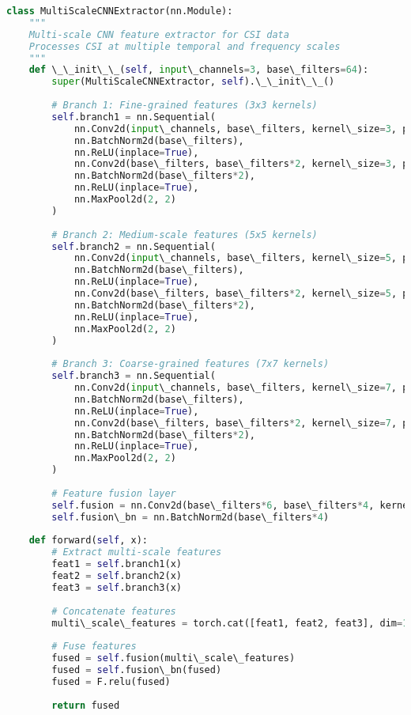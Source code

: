 \documentclass[journal]{IEEEtran}
\begin{document}
\begin{lstlisting}[language=Python, caption=Multi-Scale CNN Implementation]
class MultiScaleCNNExtractor(nn.Module):
    """
    Multi-scale CNN feature extractor for CSI data
    Processes CSI at multiple temporal and frequency scales
    """
    def \_\_init\_\_(self, input\_channels=3, base\_filters=64):
        super(MultiScaleCNNExtractor, self).\_\_init\_\_()
        
        # Branch 1: Fine-grained features (3x3 kernels)
        self.branch1 = nn.Sequential(
            nn.Conv2d(input\_channels, base\_filters, kernel\_size=3, padding=1),
            nn.BatchNorm2d(base\_filters),
            nn.ReLU(inplace=True),
            nn.Conv2d(base\_filters, base\_filters*2, kernel\_size=3, padding=1),
            nn.BatchNorm2d(base\_filters*2),
            nn.ReLU(inplace=True),
            nn.MaxPool2d(2, 2)
        )
        
        # Branch 2: Medium-scale features (5x5 kernels)
        self.branch2 = nn.Sequential(
            nn.Conv2d(input\_channels, base\_filters, kernel\_size=5, padding=2),
            nn.BatchNorm2d(base\_filters),
            nn.ReLU(inplace=True),
            nn.Conv2d(base\_filters, base\_filters*2, kernel\_size=5, padding=2),
            nn.BatchNorm2d(base\_filters*2),
            nn.ReLU(inplace=True),
            nn.MaxPool2d(2, 2)
        )
        
        # Branch 3: Coarse-grained features (7x7 kernels)
        self.branch3 = nn.Sequential(
            nn.Conv2d(input\_channels, base\_filters, kernel\_size=7, padding=3),
            nn.BatchNorm2d(base\_filters),
            nn.ReLU(inplace=True),
            nn.Conv2d(base\_filters, base\_filters*2, kernel\_size=7, padding=3),
            nn.BatchNorm2d(base\_filters*2),
            nn.ReLU(inplace=True),
            nn.MaxPool2d(2, 2)
        )
        
        # Feature fusion layer
        self.fusion = nn.Conv2d(base\_filters*6, base\_filters*4, kernel\_size=1)
        self.fusion\_bn = nn.BatchNorm2d(base\_filters*4)
        
    def forward(self, x):
        # Extract multi-scale features
        feat1 = self.branch1(x)
        feat2 = self.branch2(x)
        feat3 = self.branch3(x)
        
        # Concatenate features
        multi\_scale\_features = torch.cat([feat1, feat2, feat3], dim=1)
        
        # Fuse features
        fused = self.fusion(multi\_scale\_features)
        fused = self.fusion\_bn(fused)
        fused = F.relu(fused)
        
        return fused
\end{lstlisting}
\end{document}
